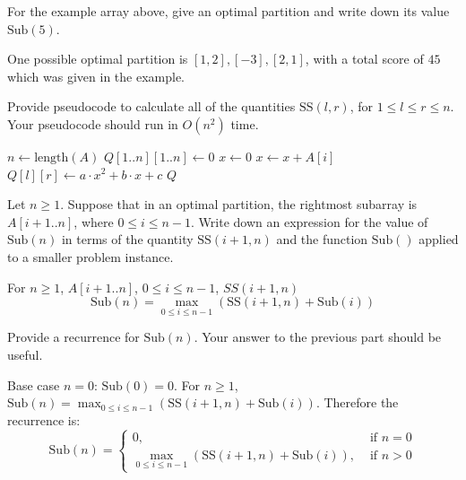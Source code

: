 \documentclass[11pt,fleqn]{exam}
\newenvironment{soln}{\color{solnblue}}{}
\newcommand{\subsum}{\mbox{SS}}
\newcommand{\sub}{\mbox{Sub}}
\newif\ifsolutions\solutionstrue
\newif\ifsolutions\solutionsfalse
\begin{document}
\begin{questions}
\question[1]
For the example array above, give an optimal partition and write down its value $\sub(5)$.

\begin{soln}
   One possible optimal partition is $[1, 2], [-3], [2, 1]$, with a total score of $45$ which
   was given in the example.
\end{soln}

\ifsolutions

\else
\fi

\question[3]
Provide pseudocode to calculate all of the quantities $\subsum(l,r)$, for $1\le l \le r \le n$. 
Your pseudocode should run in $O(n^2)$ time.

\begin{soln}
   \begin{algorithmic}[1]
         \State $n \gets \mbox{length}(A)$
         \State $Q[1..n][1..n] \gets 0$
               \State $x \gets 0$
                  \State $x \gets x + A[i]$
               \EndFor
               \State $Q[l][r] \gets a \cdot x^2 + b \cdot x + c$
            \EndFor
         \EndFor
         \State \Return $Q$
      \EndFunction
   \end{algorithmic}
\end{soln}


\ifsolutions

\else
\fi

\question[3]
Let $n \ge 1$.
Suppose that in an optimal partition, the rightmost subarray is $A[i+1..n]$, where $0 \le i \le n-1$. Write down an expression for the value of $\sub(n)$  in terms of the quantity $\subsum(i+1,n)$ and the function $\sub()$ applied to a smaller problem instance.

\begin{soln}
   For $n \geq 1$, $A[i+1..n]$, $0 \le i \le n-1$, $SS(i+1,n)$ 
   \[
   \sub(n) = \max_{0 \le i \le n-1} \left( \subsum(i+1,n) + \sub(i) \right)
   \]
\end{soln}


\ifsolutions

\else
\fi

\question[2]
Provide a recurrence for $\sub(n)$. Your answer to the previous part should be useful.

\begin{soln}
   Base case $n = 0$: $\sub(0) = 0$.
   For $n \geq 1$, $\sub(n) = \max_{0 \le i \le n-1} \left( \subsum(i+1,n) + \sub(i) \right)$.
   Therefore the recurrence is:
   \[
   \sub(n) = \left\{ \begin{array}{ll}
               0, & \mbox{ if } n = 0 \\
            \max_{0 \le i \le n-1} \left( \subsum(i+1,n) + \sub(i) \right), & \mbox{ if } n > 0
             \end{array} \right.
   \]


\end{soln}
\end{questions}
\end{document}
